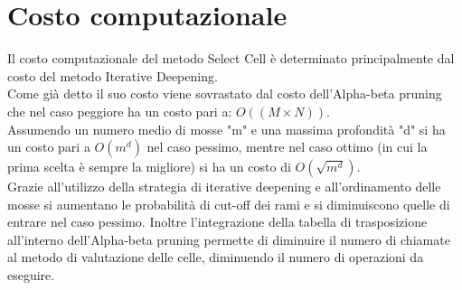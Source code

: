 \section{Costo computazionale}
Il costo computazionale del metodo Select Cell è determinato principalmente dal costo del metodo Iterative Deepening.\\
Come già detto il suo costo viene sovrastato dal costo dell'Alpha-beta pruning che nel caso peggiore ha un costo pari a: $ O((M \times N)) $.\\
Assumendo un numero medio di mosse "m" e una massima profondità "d" si ha un costo pari a $O(m^d)$ nel caso pessimo, mentre nel caso ottimo (in cui la prima scelta è sempre la migliore) si ha un costo di $O(\sqrt{m^d})$.\\
Grazie all'utilizzo della strategia di iterative deepening e all'ordinamento delle mosse si aumentano le probabilità di cut-off dei rami e si diminuiscono quelle di entrare nel caso pessimo. Inoltre l'integrazione della tabella di trasposizione all'interno dell'Alpha-beta pruning permette di diminuire il numero di chiamate al metodo di valutazione delle celle, diminuendo il numero di operazioni da eseguire.
